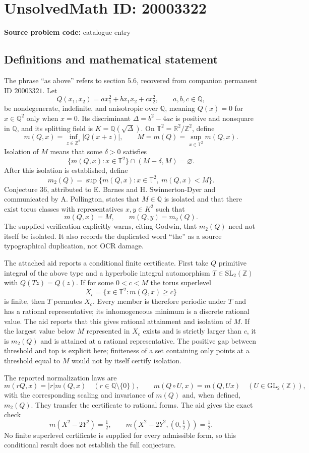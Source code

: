 \documentclass[11pt]{article}
\newcommand{\Z}{\mathbb{Z}}
\newcommand{\Q}{\mathbb{Q}}
\newcommand{\R}{\mathbb{R}}
\begin{document}
\section*{UnsolvedMath ID: 20003322}
\textbf{Source problem code:} catalogue entry
\subsection{Definitions and mathematical statement}
The phrase ``as above'' refers to section 5.6, recovered from companion permanent ID $20003321$. Let
\[
 Q(x_1,x_2)=ax_1^2+bx_1x_2+cx_2^2,\qquad a,b,c\in\Q,
\]
be nondegenerate, indefinite, and anisotropic over $\Q$, meaning $Q(x)=0$ for $x\in\Q^2$ only when $x=0$. Its discriminant $\Delta=b^2-4ac$ is positive and nonsquare in $\Q$, and its splitting field is $K=\Q(\sqrt\Delta)$. On $\mathbb T^2=\R^2/\Z^2$, define
\[
 m(Q,x)=\inf_{z\in\Z^2}|Q(x+z)|,\qquad
 M=m(Q)=\sup_{x\in\mathbb T^2}m(Q,x).
\]
Isolation of $M$ means that some $\delta>0$ satisfies
\[
 \{m(Q,x):x\in\mathbb T^2\}\cap(M-\delta,M)=\varnothing.
\]
After this isolation is established, define
\[
 m_2(Q)=\sup\{m(Q,x):x\in\mathbb T^2,\ m(Q,x)<M\}.
\]
Conjecture 36, attributed to E. Barnes and H. Swinnerton-Dyer and communicated by A. Pollington, states that $M\in\Q$ is isolated and that there exist torus classes with representatives $x,y\in K^2$ such that
\[
 m(Q,x)=M,\qquad m(Q,y)=m_2(Q).
\]
The supplied verification explicitly warns, citing Godwin, that $m_2(Q)$ need not itself be isolated. It also records the duplicated word ``the'' as a source typographical duplication, not OCR damage.

The attached aid reports a conditional finite certificate. First take $Q$ primitive integral of the above type and a hyperbolic integral automorphism $T\in\mathrm{SL}_2(\Z)$ with $Q(Tz)=Q(z)$. If for some $0<c<M$ the torus superlevel
\[
 X_c=\{x\in\mathbb T^2:m(Q,x)\ge c\}
\]
is finite, then $T$ permutes $X_c$. Every member is therefore periodic under $T$ and has a rational representative; its inhomogeneous minimum is a discrete rational value. The aid reports that this gives rational attainment and isolation of $M$. If the largest value below $M$ represented in $X_c$ exists and is strictly larger than $c$, it is $m_2(Q)$ and is attained at a rational representative. The positive gap between threshold and top is explicit here; finiteness of a set containing only points at a threshold equal to $M$ would not by itself certify isolation.

The reported normalization laws are
\[
 m(rQ,x)=|r|m(Q,x)\quad(r\in\Q\setminus\{0\}),\qquad
 m(Q\circ U,x)=m(Q,Ux)\quad(U\in\mathrm{GL}_2(\Z)),
\]
with the corresponding scaling and invariance of $m(Q)$ and, when defined, $m_2(Q)$. They transfer the certificate to rational forms. The aid gives the exact check
\[
 m(X^2-2Y^2)=\tfrac12,\qquad m(X^2-2Y^2,(0,\tfrac12))=\tfrac12.
\]
No finite superlevel certificate is supplied for every admissible form, so this conditional result does not establish the full conjecture.
\end{document}
